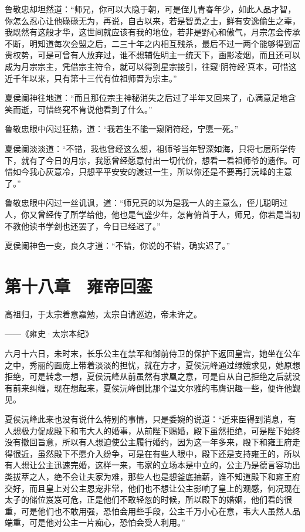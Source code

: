 鲁敬忠却坦然道：“师兄，你可以大隐于朝，可是侄儿青春年少，如此人品才智，你怎么忍心让他碌碌无为，再说，自古以来，若是智勇之士，鲜有安逸偷生之辈，我既然有这般才华，这世间就应该有我的地位，若非是野心和傲气，月宗怎会传承不断，明知道每次会盟之后，二三十年之内相互残杀，最后不过一两个能够得到富贵权势，可是可曾有人放弃过，谁不想辅佐明主一统天下，画影凌烟，而且还可以成为月宗宗主，凭借宗主符令，就可以得到星宗接引，往窥‘阴符经’真本，可惜这近千年以来，只有第十三代有位祖师晋为宗主。”

夏侯阑神往地道：“而且那位宗主神秘消失之后过了半年又回来了，心满意足地含笑而逝，可惜终究不肯说他看到了什么。”

鲁敬忠眼中闪过狂热，道：“我若生不能一窥阴符经，宁愿一死。”

夏侯阑淡淡道：“不错，我也曾经这么想，祖师爷当年智深如海，只将七层所学传下，就有了今日的月宗，我愿曾经愿意付出一切代价，想看一看祖师爷的遗作。可惜如今我心灰意冷，只想平平安安的渡过一生，所以你还是不要再打沅峰的主意了。”

鲁敬忠眼中闪过一丝讥讽，道：“师兄真的以为是我一人的主意么，侄儿聪明过人，你又曾经传了所学给他，他也是气盛少年，怎肯俯首于人，师兄，你若是当初不教他读书学剑也还罢了，今日已经迟了。”

夏侯阑神色一变，良久才道：“不错，你说的不错，确实迟了。”

\chapter{第十八章　雍帝回銮}

高祖归，于太宗着意嘉勉，太宗自请巡边，帝未许之。

——《雍史·太宗本纪》

六月十六日，未时末，长乐公主在禁军和御前侍卫的保护下返回皇宫，她坐在公车之中，秀丽的面庞上带着淡淡的担忧，就在方才，夏侯沅峰通过绿娥求见，她原想拒绝，可是转念一想，夏侯沅峰从前虽然有求凰之意，可是自从自己拒绝之后就没有前来纠缠，现在想起来，夏侯沅峰倒比那个温文尔雅的韦膺识趣一些，便许他觐见。

夏侯沅峰此来也没有说什么特别的事情，只是委婉的说道：“近来臣得到消息，有人想极力促成殿下和韦大人的婚事，从前陛下赐婚，殿下虽然拒绝，可是陛下始终没有撤回旨意，所以有人想迫使公主履行婚约，因为这一年多来，殿下和雍王府走得很近，虽然殿下不愿介入纷争，可是在有些人眼中，殿下还是支持雍王的，所以有人想让公主迅速完婚，这样一来，韦家的立场本是中立的，公主乃是德言容功出类拔萃之人，绝不会让夫家为难，那些人也是想釜底抽薪，谁不知道殿下和雍王府交好，而且皇上对公主恩宠非常，他们也不想让公主影响了皇上的观感，何况现在太子的储位岌岌可危，正是他们不敢轻忽的时候，所以殿下的婚姻，他们看的很重，可是他们也不敢用强，恐怕会用些手段，公主千万小心在意，韦大人虽然人品端重，可是他对公主一片痴心，恐怕会受人利用。”

